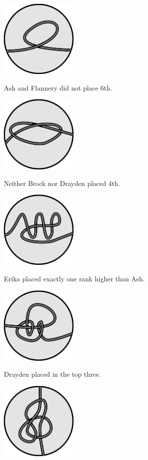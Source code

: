 
\begin{multicols}{3}
  \begin{center}
    \includegraphics[width=1.5in]{assets/unknot1.pdf}

    Ash and Flannery did not place 6th.


    \includegraphics[width=1.5in]{assets/knot1.pdf}

    Neither Brock nor Drayden placed 4th.


    \includegraphics[width=1.5in]{assets/unknot2.pdf}

    Erika placed exactly one rank higher than Ash.


    \includegraphics[width=1.5in]{assets/knot2.pdf}

    Drayden placed in the top three.


    \includegraphics[width=1.5in]{assets/knot3.pdf}


\end{center}
\end{multicols}
